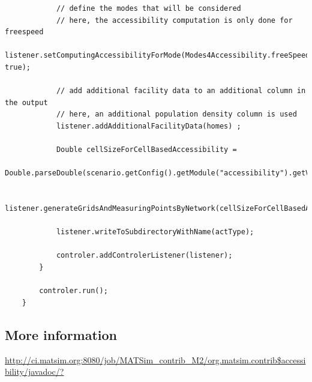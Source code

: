 \begin{lstlisting}
			// define the modes that will be considered
			// here, the accessibility computation is only done for freespeed
			listener.setComputingAccessibilityForMode(Modes4Accessibility.freeSpeed, true);

			// add additional facility data to an additional column in the output
			// here, an additional population density column is used
			listener.addAdditionalFacilityData(homes) ;
			
			Double cellSizeForCellBasedAccessibility = 
					Double.parseDouble(scenario.getConfig().getModule("accessibility").getValue("cellSizeForCellBasedAccessibility"));

			listener.generateGridsAndMeasuringPointsByNetwork(cellSizeForCellBasedAccessibility);
						
			listener.writeToSubdirectoryWithName(actType);
			
			controler.addControlerListener(listener);
		}
					
		controler.run();
	}
\end{lstlisting}

\subsection{More information}

\url{http://ci.matsim.org:8080/job/MATSim_contrib_M2/org.matsim.contrib$accessibility/javadoc/?}

%



